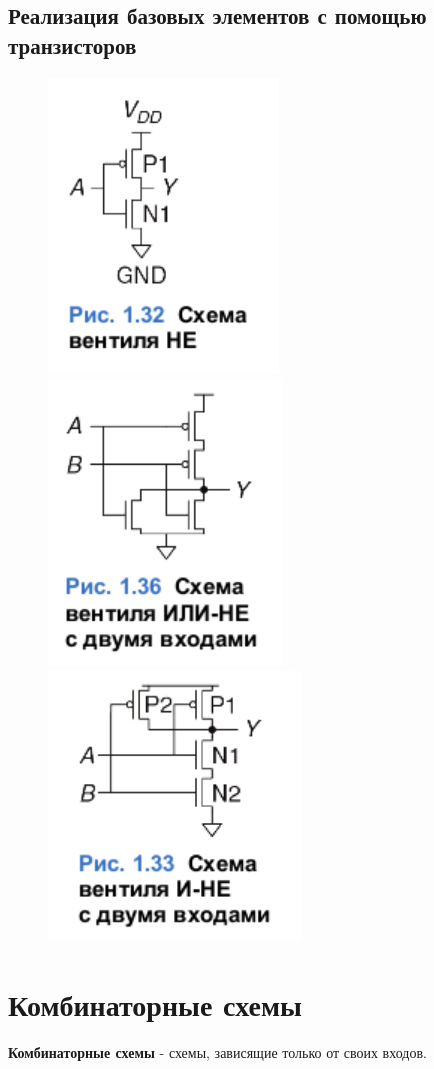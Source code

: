 \documentclass[12pt, a4paper]{article}
\begin{document}
\subsection{Реализация базовых элементов с помощью транзисторов}
\begin{figure}[h]
  \includegraphics[width=0.3\linewidth]{./images/NOT.png}
  \includegraphics[width=0.3\linewidth]{./images/NOR.png}
  \includegraphics[width=0.3\linewidth]{./images/NAND.png}
  \label{fig:tr-el}
\end{figure}

\section{Комбинаторные схемы}
\textbf{Комбинаторные схемы} - схемы, зависящие только от своих входов.
\end{document}

